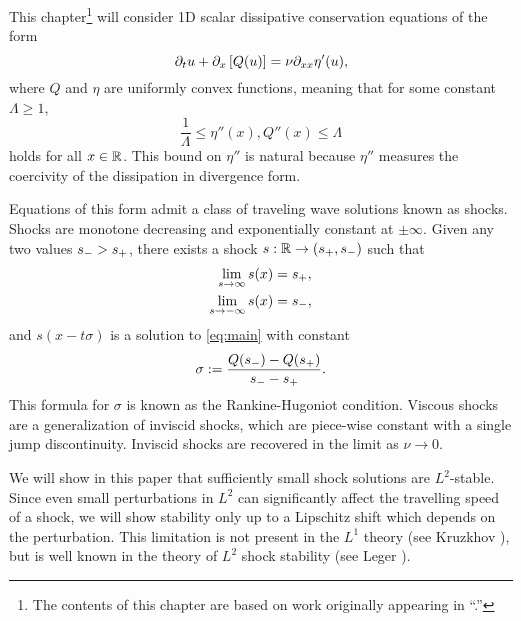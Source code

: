 This chapter\footnote{The contents of this chapter are based on work originally appearing in ``.''} will consider 1D scalar dissipative conservation equations of the form
\begin{equation} \label{eq:main} 
\partial_t u + \partial_x\left[ Q(u) \right] = \nu \partial_{xx} \eta'(u), 
\end{equation}
where $Q$ and $\eta$ are uniformly convex functions, meaning that for some constant $\Lambda \geq 1$,
\begin{equation} \label{convexity condition}
\frac{1}{\Lambda} \leq \eta''(x), Q''(x) \leq \Lambda
\end{equation}
holds for all $x \in \mathbb{R}$.  This bound on $\eta''$ is natural because $\eta''$ measures the coercivity of the dissipation in divergence form.

Equations of this form admit a class of traveling wave solutions known as shocks.  Shocks are monotone decreasing and exponentially constant at $\pm \infty$.  Given any two values $s_- > s_+$, there exists a shock $s:\mathbb{R} \to (s_+, s_-)$ such that
\begin{align*}
\lim_{s \to \infty} s(x) &= s_+, \\
\lim_{s \to -\infty} s(x) &= s_-,
\end{align*}
and $s(x-t \sigma)$ is a solution to \eqref{eq:main} with constant
\[ \sigma := \frac{Q(s_-) - Q(s_+)}{s_- - s_+}. \]
This formula for $\sigma$ is known as the Rankine-Hugoniot condition.  Viscous shocks are a generalization of inviscid shocks, which are piece-wise constant with a single jump discontinuity.  Inviscid shocks are recovered in the limit as $\nu \to 0$.  

We will show in this paper that sufficiently small shock solutions are $L^2$-stable.  Since even small perturbations in $L^2$ can significantly affect the travelling speed of a shock, we will show stability only up to a Lipschitz shift which depends on the perturbation.  This limitation is not present in the $L^1$ theory (see Kruzkhov \cite{Kr.entropy}), but is well known in the theory of $L^2$ shock stability (see Leger \cite{Le}).  

